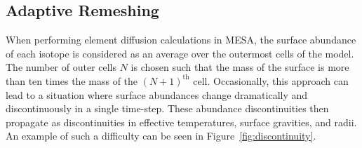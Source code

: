 \subsection{Adaptive Remeshing}
\label{sec:remeshing}

When performing element diffusion calculations in MESA, the surface abundance of each isotope is considered as an average over the outermost cells of the model. The number of outer cells ${N}$ is chosen such that the mass of the surface is more than ten times the mass of the ${(N+1)^{\text{th}}}$ cell. Occasionally, this approach can lead to a situation where surface abundances change dramatically and discontinuously in a single time-step. These abundance discontinuities then propagate as discontinuities in effective temperatures, surface gravities, and radii. An example of such a difficulty can be seen in Figure~\ref{fig:discontinuity}. 

